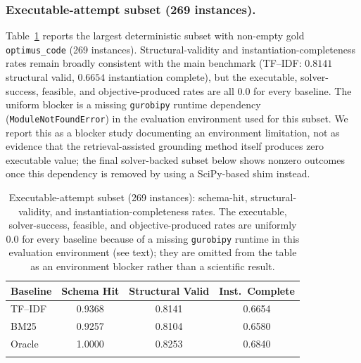 \documentclass[pdflatex,sn-basic,Numbered]{sn-jnl}
\begin{document}
\subsubsection{Executable-attempt subset (269 instances).} Table~\ref{tab:eng-executable} reports the largest deterministic subset with non-empty gold \texttt{optimus\_code} (269 instances). Structural-validity and instantiation-completeness rates remain broadly consistent with the main benchmark (TF--IDF: $0.8141$ structural valid, $0.6654$ instantiation complete), but the executable, solver-success, feasible, and objective-produced rates are all $0.0$ for every baseline. The uniform blocker is a missing \texttt{gurobipy} runtime dependency (\texttt{ModuleNotFoundError}) in the evaluation environment used for this subset. We report this as a blocker study documenting an environment limitation, not as evidence that the retrieval-assisted grounding method itself produces zero executable value; the final solver-backed subset below shows nonzero outcomes once this dependency is removed by using a SciPy-based shim instead.

\begin{table}[t]
\centering
\caption{Executable-attempt subset (269 instances): schema-hit, structural-validity, and instantiation-completeness rates. The executable, solver-success, feasible, and objective-produced rates are uniformly $0.0$ for every baseline because of a missing \texttt{gurobipy} runtime in this evaluation environment (see text); they are omitted from the table as an environment blocker rather than a scientific result.}
\label{tab:eng-executable}
\small
\begin{tabular}{lccc}
  \toprule
  Baseline & Schema Hit & Structural Valid & Inst.\ Complete \\
  \midrule
  TF--IDF & 0.9368 & 0.8141 & 0.6654 \\
  BM25    & 0.9257 & 0.8104 & 0.6580 \\
  Oracle  & 1.0000 & 0.8253 & 0.6840 \\
  \botrule
\end{tabular}
\end{table}
\end{document}
